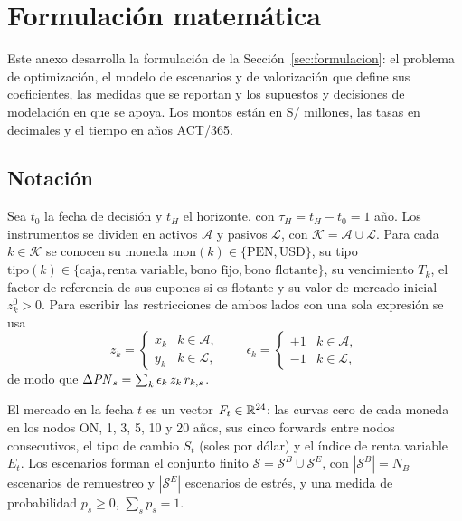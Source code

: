 \section{Formulación matemática}\label{app:formulacion}
Este anexo desarrolla la formulación de la Sección~\ref{sec:formulacion}: el problema de optimización, el
modelo de escenarios y de valorización que define sus coeficientes, las medidas que se reportan y los
supuestos y decisiones de modelación en que se apoya. Los montos están en S/ millones, las tasas en
decimales y el tiempo en años ACT/365.

\subsection{Notación}
Sea $t_0$ la fecha de decisión y $t_H$ el horizonte, con $\tau_H = t_H - t_0 = 1$ año. Los instrumentos
se dividen en activos $\mathcal{A}$ y pasivos $\mathcal{L}$, con $\mathcal{K} = \mathcal{A} \cup \mathcal{L}$.
Para cada $k \in \mathcal{K}$ se conocen su moneda $\text{mon}(k) \in \{\text{PEN}, \text{USD}\}$, su tipo
$\text{tipo}(k) \in \{\text{caja}, \text{renta variable}, \text{bono fijo}, \text{bono flotante}\}$, su
vencimiento $T_k$, el factor de referencia de sus cupones si es flotante y su valor de mercado inicial
$z_k^0 > 0$. Para escribir las restricciones de ambos lados con una sola expresión se usa
\[
  z_k = \begin{cases} x_k & k \in \mathcal{A},\\ y_k & k \in \mathcal{L}, \end{cases}
  \qquad
  \epsilon_k = \begin{cases} +1 & k \in \mathcal{A},\\ -1 & k \in \mathcal{L}, \end{cases}
\]
de modo que $\Delta\mathit{PN}_s = \sum_{k} \epsilon_k\, z_k\, r_{k,s}$.

El mercado en la fecha $t$ es un vector $F_t \in \mathbb{R}^{24}$: las curvas cero de cada moneda en los nodos ON,
1, 3, 5, 10 y 20 años, sus cinco forwards entre nodos consecutivos, el tipo de cambio
$S_t$ (soles por dólar) y el índice de renta variable $E_t$. Los escenarios forman el conjunto finito
$\mathcal{S} = \mathcal{S}^B \cup \mathcal{S}^E$, con $|\mathcal{S}^B| = N_B$ escenarios de remuestreo y
$|\mathcal{S}^E|$ escenarios de estrés, y una medida de probabilidad $p_s \ge 0$, $\sum_{s} p_s = 1$.

